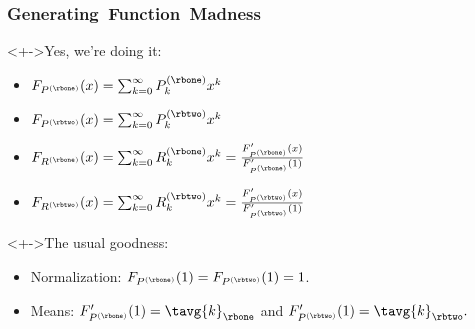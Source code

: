 \begin{frame}
  \frametitle{Generating\ Function\ Madness}

  \begin{block}<+->{Yes, we're doing it:}
    \begin{itemize}
    \item<+-> 
      $
      F_{P^{(\rbone)}}(x)
      =
      \sum_{k=0}^{\infty}
      P^{(\rbone)}_{k} x^k
      $
    \item<+-> 
      $
      F_{P^{(\rbtwo)}}(x)
      =
      \sum_{k=0}^{\infty}
      P^{(\rbtwo)}_{k} x^k
      $
    \item<+-> 
      $
      F_{R^{(\rbone)}}(x)
      =
      \sum_{k=0}^{\infty}
      R^{(\rbone)}_{k} x^k
      =
      \frac{
        F'_{P^{(\rbone)}}(x)
      }
      {
        F'_{P^{(\rbone)}}(1)
      }
      $
    \item<+-> 
      $
      F_{R^{(\rbtwo)}}(x)
      =
      \sum_{k=0}^{\infty}
      R^{(\rbtwo)}_{k} x^k
      =
      \frac{
        F'_{P^{(\rbtwo)}}(x)
      }
      {
        F'_{P^{(\rbtwo)}}(1)
      }
      $
    \end{itemize}
  \end{block}

  \begin{block}<+->{The usual goodness:}
    \begin{itemize}
    \item<+-> 
      Normalization:
      $
      F_{P^{(\rbone)}}(1) 
      =
      F_{P^{(\rbtwo)}}(1) 
      =
      1
      $.
    \item<+->
      Means:
      $
      F'_{P^{(\rbone)}}(1)
      =
      \tavg{k}_{\rbone}
      $
      and
      $
      F'_{P^{(\rbtwo)}}(1)
      =
      \tavg{k}_{\rbtwo}.
      $
    \end{itemize}
  \end{block}

\end{frame}

